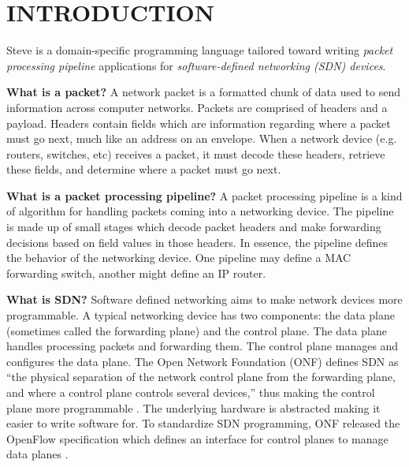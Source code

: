 \chapter{INTRODUCTION} \label{ch:intro}

%
%


Steve is a domain-specific programming language tailored toward writing \emph{packet processing pipeline} applications for \emph{software-defined networking (SDN) devices}.

\textbf{What is a packet?} A network packet is a formatted chunk of data used to send information across computer networks. Packets are comprised of headers and a payload. Headers contain fields which are information regarding where a packet must go next, much like an address on an envelope. When a network device (e.g. routers, switches, etc) receives a packet, it must decode these headers, retrieve these fields, and determine where a packet must go next.

\textbf{What is a packet processing pipeline?} A packet processing pipeline is a kind of algorithm for handling packets coming into a networking device. The pipeline is made up of small stages which decode packet headers and make forwarding decisions based on field values in those headers. In essence, the pipeline defines the behavior of the networking device. One pipeline may define a MAC forwarding switch, another might define an IP router.

\textbf{What is SDN?} Software defined networking aims to make network devices more programmable. A typical networking device has two components: the data plane (sometimes called the forwarding plane) and the control plane. The data plane handles processing packets and forwarding them. The control plane manages and configures the data plane. The Open Network Foundation (ONF) defines SDN as ``the physical separation of the network control plane from the forwarding plane, and where a control plane controls several devices,'' thus making the control plane more programmable \cite{onf_sdn_def}. The underlying hardware is abstracted making it easier to write software for. To standardize SDN programming, ONF released the OpenFlow specification which defines an interface for control planes to manage data planes \cite{openflow_spec}.

